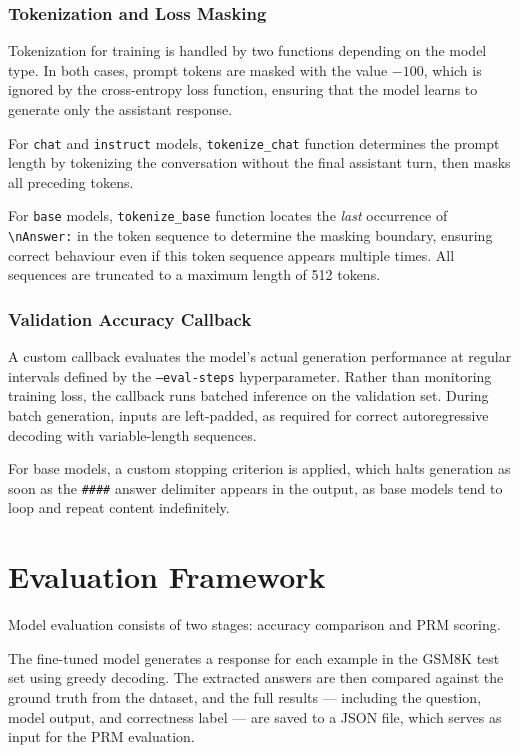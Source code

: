   \subsubsection*{Tokenization and Loss Masking}
    Tokenization for training is handled by two
  functions depending on the model type. In both cases,
  prompt tokens are masked with the value $-100$, which
  is ignored by the cross-entropy loss function, ensuring
  that the model learns to generate only the assistant
  response.

  For \texttt{chat} and \texttt{instruct} models,
  \texttt{tokenize\_chat} function determines the prompt length
  by tokenizing the conversation without the final
  assistant turn, then masks all preceding tokens.

  For \texttt{base} models, \texttt{tokenize\_base} function
  locates the \textit{last} occurrence of
  \texttt{\textbackslash nAnswer:} in the token
  sequence to determine the masking boundary, ensuring
  correct behaviour even if this token sequence appears
  multiple times. All sequences are truncated to a
  maximum length of 512 tokens.

  \subsubsection*{Validation Accuracy Callback}
 A custom callback evaluates the model's actual
  generation performance at regular intervals
  defined by the \texttt{--eval-steps}
  hyperparameter. Rather than monitoring training
  loss, the callback runs batched inference on
  the validation set. During batch generation,
  inputs are left-padded, as required for correct
  autoregressive decoding with variable-length
  sequences.

  For base models, a custom stopping criterion
  is applied, which halts generation as soon as
  the \texttt{\#\#\#\#} answer delimiter appears
  in the output, as base models tend to loop and
  repeat content indefinitely.


\section{Evaluation Framework}
\label{sec:evaluation}
Model evaluation consists of two stages:
  accuracy comparison and PRM scoring.

  The fine-tuned model generates a response
  for each example in the GSM8K test set using
  greedy decoding. The extracted answers are
  then compared against the ground truth from
  the dataset, and the full results --- including
  the question, model output, and correctness
  label --- are saved to a JSON file, which
  serves as input for the PRM evaluation.

